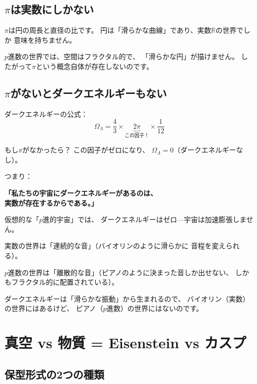 \documentclass[12pt,a4paper]{article}
\begin{document}
\subsection{$\pi$は実数にしかない}

$\pi$は円の周長と直径の比です。
円は「滑らかな曲線」であり、実数$\mathbb{R}$の世界でしか
意味を持ちません。

$p$進数の世界では、空間はフラクタル的で、
「滑らかな円」が描けません。
したがって$\pi$という概念自体が存在しないのです。

\subsection{$\pi$がないとダークエネルギーもない}

\begin{wowbox}[驚くべき帰結]
ダークエネルギーの公式：
\[
  \Omega_\Lambda = \frac{4}{3} \times \underbrace{2\pi}_{\text{この因子！}} \times \frac{1}{12}
\]

もし$\pi$がなかったら？ この因子がゼロになり、
$\Omega_\Lambda = 0$（ダークエネルギーなし）。

つまり：
\begin{center}
\textbf{「私たちの宇宙にダークエネルギーがあるのは、\\
実数が存在するからである。」}
\end{center}

仮想的な「$p$進的宇宙」では、
ダークエネルギーはゼロ---宇宙は加速膨張しません。
\end{wowbox}

\begin{analogy}[音楽のアナロジー]
実数の世界は「連続的な音」（バイオリンのように滑らかに
音程を変えられる）。

$p$進数の世界は「離散的な音」（ピアノのように決まった音しか出せない、
しかもフラクタル的に配置されている）。

ダークエネルギーは「滑らかな振動」から生まれるので、
バイオリン（実数）の世界にはあるけど、
ピアノ（$p$進数）の世界にはないのです。
\end{analogy}

\section{真空 vs 物質 = Eisenstein vs カスプ}

\subsection{保型形式の2つの種類}
\end{document}
